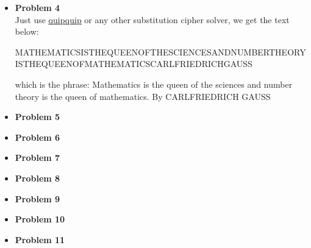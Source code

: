\documentclass{article}
\begin{document}
\begin{itemize}
\begin{enumerate}[label=(\roman*)]
		\end{enumerate}
	\item{\textcolor{for}{\textbf{Problem 4}}}\\
		Just use \href{https://quipqiup.com/}{\underline{quipquip}} or any other substitution cipher solver, we get the text below:\\
		\begin{small}
			MATHEMATICSISTHEQUEENOFTHESCIENCESANDNUMBERTHEORYISTHEQUEENOFMATHEMATICSCARLFRIEDRICHGAUSS 
		\end{small}
		which is the phrase:
			Mathematics is the queen of the sciences and number theory is the queen of mathematics. By CARLFRIEDRICH GAUSS
	\item{\textcolor{for}{\textbf{Problem 5}}}
	\item{\textcolor{for}{\textbf{Problem 6}}}
	\item{\textcolor{for}{\textbf{Problem 7}}}
	\item{\textcolor{for}{\textbf{Problem 8}}}
	\item{\textcolor{for}{\textbf{Problem 9}}}
	\item{\textcolor{for}{\textbf{Problem 10}}}
	\item{\textcolor{for}{\textbf{Problem 11}}}
\end{itemize}
\end{document}
